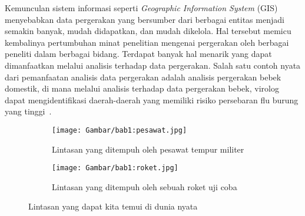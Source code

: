 

Kemunculan sistem informasi seperti \textit{Geographic Information System} (GIS) menyebabkan data pergerakan yang bersumber dari berbagai entitas menjadi semakin banyak, mudah didapatkan, dan mudah dikelola. Hal tersebut memicu kembalinya pertumbuhan minat penelitian mengenai pergerakan oleh berbagai peneliti dalam berbagai bidang. Terdapat banyak hal menarik yang dapat dimanfaatkan melalui analisis terhadap data pergerakan. Salah satu contoh nyata dari pemanfaatan analisis data pergerakan adalah analisis pergerakan bebek domestik, di mana melalui analisis terhadap data pergerakan bebek, virolog dapat mengidentifikasi daerah-daerah yang memiliki risiko persebaran flu burung yang tinggi~\cite{diann:01:movement-analysis}.

\begin{figure}[h]
    \centering
    \begin{subfigure}[h]{0.425\textwidth}
        \centering
        \texttt{[image: Gambar/bab1:pesawat.jpg]}
        \caption{Lintasan yang ditempuh oleh pesawat tempur militer\protect\footnotemark[4]}
        \label{bab1:fighter-plane}
    \end{subfigure} \hspace{0.5cm}
    \begin{subfigure}[h]{0.425\textwidth}
        \centering
        \texttt{[image: Gambar/bab1:roket.jpg]}
        \caption{Lintasan yang ditempuh oleh sebuah roket uji coba\protect\footnotemark[5]}
        \label{bab1:rocket}
    \end{subfigure}
    \caption[Lintasan dalam dunia nyata]{Lintasan yang dapat kita temui di dunia nyata}
    \label{bab1:trajectory}
\end{figure}

